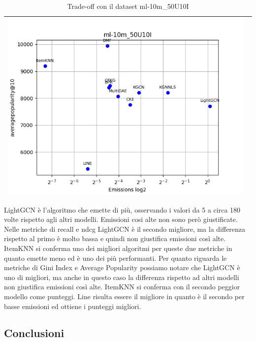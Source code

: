 \begin{table}[H]
\begin{tabularx}{\textwidth}{|X|X|}
        \includegraphics[width=\linewidth, trim=0 0 0 0]{images/averagepopularity@10_ml-10m_50U10I.png} \\
        \hline
    \end{tabularx}
    \caption{Trade-off con il dataset ml-10m\_50U10I}
    \label{tab:emissions_info}
\end{table}

\noindent LightGCN è l'algoritmo che emette di più, osservando i valori da 5 a circa 180 volte rispetto agli altri modelli.
Emissioni cosi alte non sono però giustificate. Nelle metriche di recall e ndcg LightGCN è il secondo migliore, ma la differenza rispetto al primo è molto bassa e quindi non giustifica emissioni così alte.
ItemKNN si conferma uno dei migliori algoritmi per queste due metriche in quanto emette meno ed è uno dei più performanti.
Per quanto riguarda le metriche di Gini Index e Average Popularity possiamo notare che LightGCN è uno di migliori, ma anche in questo caso la differenza rispetto ad altri modelli non giustifica emissioni così alte. ItemKNN si conferma con il secondo peggior modello come punteggi. Line risulta essere il migliore in quanto è il secondo per basse emissioni ed ottiene i punteggi migliori. 

\subsection{Conclusioni}

